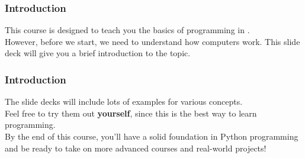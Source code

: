 \documentclass{beamer}
\begin{document}
\begin{frame}
  \frametitle{Introduction}
  This course is designed to teach you the basics of programming in .\\
  \vspace{0.5cm}
  However, before we start, we need to understand how computers work. This slide deck will give you a brief introduction to the topic. 
\end{frame}
\begin{frame}
  \frametitle{Introduction}
  The slide decks will include lots of examples for various concepts. \\
  Feel free to try them out \textbf{yourself}, since this is the best way to learn programming.\\
  \vspace{0.5cm}
  By the end of this course, you'll have a solid foundation in Python programming and be ready to take on more advanced courses and real-world projects!
\end{frame}
\label{sec:binary_numbers}
\end{document}
